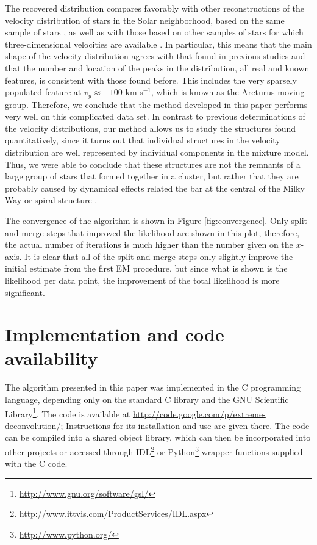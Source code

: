 \documentclass[aoas,preprint,authoryear,round]{imsart}
\begin{document}
The recovered distribution compares favorably with other
reconstructions of the velocity distribution of stars in the Solar
neighborhood, based on the same sample of stars \citep[using a maximum
penalized likelihood density estimation
technique,][]{1998AJ....115.2384D}, as well as with those based on
other samples of stars for which three-dimensional velocities are
available
\citep{1999MNRAS.308..731S,2004A&A...418..989N,2005A&A...430..165F,2008A&A...490..135A}. In
particular, this means that the main shape of the velocity
distribution agrees with that found in previous studies and that the
number and location of the peaks in the distribution, all real and
known features, is consistent with those found before. This includes
the very sparsely populated feature at $v_y \approx -100$ km s$^{-1}$,
which is known as the Arcturus moving group. Therefore, we conclude
that the method developed in this paper performs very well on this
complicated data set. In contrast to previous determinations of the
velocity distributions, our method allows us to study the structures
found quantitatively, since it turns out that individual structures in
the velocity distribution are well represented by individual
components in the mixture model. Thus, we were able to conclude that
these structures are not the remnants of a large group of stars that
formed together in a cluster, but rather that they are probably caused
by dynamical effects related the bar at the central of the Milky Way
or spiral structure \citep{Bovy10a}.

The convergence of the algorithm is shown in Figure
\ref{fig:convergence}. Only split-and-merge steps that improved the
likelihood are shown in this plot, therefore, the actual number of
iterations is much higher than the number given on the $x$-axis. It is
clear that all of the split-and-merge steps only slightly improve the
initial estimate from the first EM procedure, but since what is shown
is the likelihood per data point, the improvement of the total
likelihood is more significant. 


\section{Implementation and code availability}

The algorithm presented in this paper was implemented in the C
programming language, depending only on the standard C library and the
GNU Scientific
Library\footnote{\url{http://www.gnu.org/software/gsl/}}. The code is
available at \url{http://code.google.com/p/extreme-deconvolution/};
Instructions for its installation and use are given there. The code
can be compiled into a shared object library, which can then be
incorporated into other projects or accessed through
IDL\footnote{\url{http://www.ittvis.com/ProductServices/IDL.aspx}} or
Python\footnote{\url{http://www.python.org/}} wrapper functions
supplied with the C code.
\end{document}

